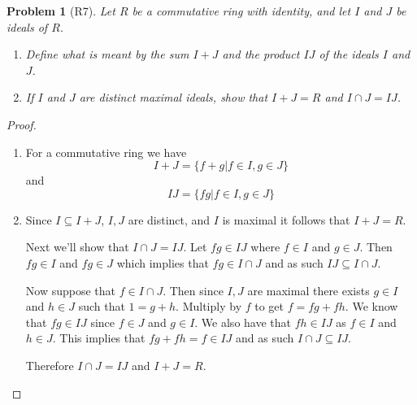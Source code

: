 \documentclass[10pt]{article}
\newcommand{\sk}{\vskip 10mm}
\theoremstyle{plain}
\newtheorem{problem}{Problem}
\theoremstyle{remark}
\begin{document}
\sk


\begin{problem}[R7]
  Let $R$ be a commutative ring with identity, and let $I$ and $J$ be ideals
  of $R$.
  \begin{enumerate}
  \item Define what is meant by the sum $I+J$ and the product $IJ$ of
    the ideals $I$ and $J$.
  \item If $I$ and $J$ are distinct maximal ideals, show that $I+J=R$ and
    $I\cap J=IJ$.
  \end{enumerate}
\end{problem}

\begin{proof}
  \begin{enumerate}
  \item For a commutative ring we have
    \[ I+J = \{f+g|f\in I,g\in J\}\]
    and
    \[ IJ = \{fg|f\in I, g\in J \}\]
  \item Since $I\subseteq I+J$, $I,J$ are distinct, and $I$ is maximal it follows that $I+J=R$.

    Next we'll show that $I\cap J=IJ$. Let $fg\in IJ$ where $f\in I$ and $g\in J$. Then $fg\in I$ and $fg\in J$ which implies that
    $fg\in I\cap J$ and as such $IJ\subseteq I\cap J$.

    Now suppose that $f\in I\cap J$. Then since $I,J$ are maximal there exists $g\in I$ and $h\in J$ such that
    $1=g+h$. Multiply by $f$ to get $f=fg+fh$. We know that $fg\in IJ$ since $f\in J$ and $g\in I$. We also have
    that $fh \in IJ$ as $f\in I$ and $h\in J$. This implies that $fg+fh=f\in IJ$ and as such $I\cap J \subseteq IJ$.

    Therefore $I\cap J = IJ$ and $I+J = R$.
  \end{enumerate}
\end{proof}

\end{document}
